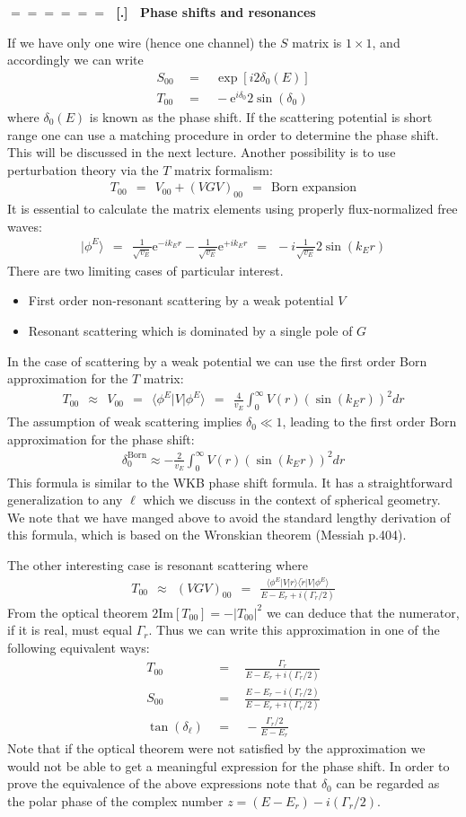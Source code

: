\documentclass[onecolumn,fleqn]{revtex4}
\newcommand{\im}{\mathrm{Im}}
\newcommand{\eexp}{\mathrm{e}^}
\newcommand{\tbox}[1]{\text{#1}}
\newcommand{\beq}{\begin{eqnarray}}
\newcommand{\eeq}{\end{eqnarray}}
\renewcommand{\thesubsection}{\arabic{subsection}}
\renewcommand{\thesubsubsection}{\arabic{subsubsection}}
\newcommand{\sheadC}[1]
{
\addtocounter{subsubsection}{1}
\vspace{5mm}
{\Large\bf $=\!=\!=\!=\!=\!=\;$ [\thesubsection.\thesubsubsection] \ #1}  
\nopagebreak
\phantomsection
}
\begin{document}
\sheadC{Phase shifts and resonances}


If we have only one wire (hence one channel) 
the $S$ matrix is ${1\times1}$, and accordingly 
we can write 
\beq
S_{00} \ \ &=& \ \ \exp[i2\delta_0(E)] \\
T_{00} \ \ &=& \ \ -\eexp{i\delta_{0}} 2\sin(\delta_{0})
\eeq     
where $\delta_0(E)$ is known as the phase shift. 
If the scattering potential is short range one 
can use a matching procedure in order to determine 
the phase shift. This will be discussed in the next 
lecture. Another possibility is to use perturbation 
theory via the $T$ matrix formalism:
\beq
T_{00} \ \ = \ \ V_{00} + (VGV)_{00} \ \ = \ \ \mbox{Born expansion}
\eeq     
It is essential to calculate the matrix elements 
using properly flux-normalized free waves:
\beq 
|\phi^{E}\rangle 
\ \ = \ \ 
\frac{1}{\sqrt{v_E}}\eexp{-ik_Er} - \frac{1}{\sqrt{v_E}}\eexp{+ik_Er} 
\ \ = \ \
-i \frac{1}{\sqrt{v_E}} 2\sin(k_Er) 
\eeq
There are two limiting cases of particular interest.  
\begin{itemize}
\setlength{\itemsep}{0mm}
\item 
First order non-resonant scattering by a weak potential $V$  
\item
Resonant scattering which is dominated by a single pole of $G$  
\end{itemize}
In the case of scattering by a weak potential 
we can use the first order Born approximation 
for the $T$ matrix: 
\beq
T_{00} 
\ \ \approx \ \  
V_{00} 
\ \ = \ \ 
\langle \phi^{E} | V |  \phi^{E} \rangle
\ \ = \ \ 
\frac{4}{v_E} \int_{0}^{\infty} V(r)\left(\sin(k_Er)\right)^2 dr 
\eeq
The assumption of weak scattering 
implies $\delta_{0} \ll 1$, leading to the 
first order Born approximation for the phase shift: 
\beq
\delta^{\tbox{Born}}_{0} \approx
-\frac{2}{v_E} \int_{0}^{\infty} V(r)\left(\sin(k_Er)\right)^2 dr 
\eeq
This formula is similar to the WKB phase shift formula. 
It has a straightforward generalization to any $\ell$ 
which we discuss in the context of spherical geometry.   
We note that we have manged above to avoid the standard 
lengthy derivation of this formula, 
which is based on the Wronskian theorem (Messiah p.404).


The other interesting case is resonant scattering where 
\beq
T_{00} \ \  \approx \ \ (VGV)_{00}
\ \ = \ \ 
\frac{ \langle \phi^{E} | V | r \rangle \langle \tilde{r} | V | \phi^{E} \rangle }
{E-E_{r}+i(\Gamma_{r}/2)}
\eeq
From the optical theorem $2\im[T_{00}]=-|T_{00}|^{2}$  
we can deduce that the numerator, if it is real,  
must equal $\Gamma_r$. 
Thus we can write this approximation 
in one of the following equivalent ways:  
\beq
T_{00} \ \ &=& \ \ \frac{\Gamma_{r}}{E-E_{r}+i(\Gamma_{r}/2)}
\\
S_{00} \ \ &=& \ \ \frac{E-E_{r}-i(\Gamma_{r}/2)}{E-E_{r}+i(\Gamma_{r}/2)}
\\ 
\tan(\delta_{\ell}) \ \ &=& \ \ -\frac{\Gamma_r/2}{E-E_r}
\eeq
Note that if the optical 
theorem were not satisfied 
by the approximation 
we would not be able 
to get a meaningful expression 
for the phase shift.   
In order to prove the equivalence 
of the above expressions note 
that $\delta_0$ can be regarded  
as the polar phase of the complex 
number ${z= (E{-}E_{r})-i(\Gamma_{r}/2)}$.
\end{document}
